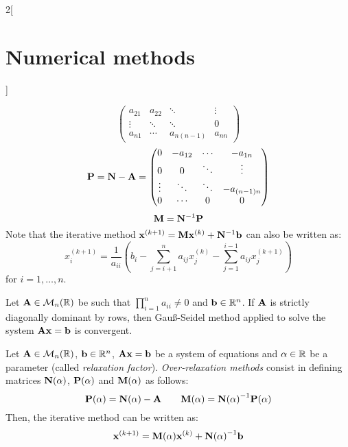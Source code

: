 \documentclass[../../../main.tex]{subfiles}
\begin{document}
\begin{multicols}{2}[\section{Numerical methods}]
\begin{definition}
\begin{equation*}
\begin{pmatrix}
                a_{21} & a_{22} & \ddots     & \vdots \\
                \vdots & \ddots & \ddots     & 0      \\
                a_{n1} & \cdots & a_{n(n-1)} & a_{nn}
            \end{pmatrix}
        \end{equation*}
        \begin{equation*}
            \vb{P}=\vb{N}-\vb{A}=
            \begin{pmatrix}
                0      & -a_{12} & \cdots & -a_{1n}     \\
                0      & 0       & \ddots & \vdots      \\
                \vdots & \ddots  & \ddots & -a_{(n-1)n} \\
                0      & \cdots  & 0      & 0
            \end{pmatrix}
        \end{equation*}
        \begin{equation*}
            \vb{M}=\vb{N}^{-1}\vb{P}
        \end{equation*}
        Note that the iterative method $\vb{x}^{(k+1)}=\vb{M}\vb{x}^{(k)}+\vb{N}^{-1}\vb{b}$ can also be written as: $$x_i^{(k+1)}=\frac{1}{a_{ii}}\left(b_i-\sum_{j=i+1}^na_{ij}x_j^{(k)}-\sum_{j=1}^{i-1}a_{ij}x_j^{(k+1)}\right)$$ for $i=1,\ldots,n$.
    \end{definition}
    \begin{theorem}
        Let $\vb{A}\in\mathcal{M}_n(\mathbb{R})$ be such that $\prod_{i=1}^na_{ii}\ne 0$ and $\vb{b}\in\mathbb{R}^n$. If $\vb{A}$ is strictly diagonally dominant by rows, then Gau\ss-Seidel method applied to solve the system $\vb{A}\vb{x}=\vb{b}$ is convergent.
    \end{theorem}
    \begin{method}
        Let $\vb{A}\in\mathcal{M}_n(\mathbb{R})$, $\vb{b}\in\mathbb{R}^n$, $\vb{A}\vb{x}=\vb{b}$ be a system of equations and $\alpha\in\mathbb{R}$ be a parameter (called \textit{relaxation factor}). \textit{Over-relaxation methods} consist in defining matrices $\vb{N}(\alpha)$, $\vb{P}(\alpha)$ and $\vb{M}(\alpha)$ as follows:
        $$\vb{P}(\alpha)=\vb{N}(\alpha)-\vb{A}\qquad\vb{M}(\alpha)={\vb{N}(\alpha)}^{-1}\vb{P}(\alpha)$$
        Then, the iterative method can be written as: $$\vb{x}^{(k+1)}=\vb{M}(\alpha)\vb{x}^{(k)}+{\vb{N}(\alpha)}^{-1}\vb{b}$$

\end{method}
\end{multicols}
\end{document}
